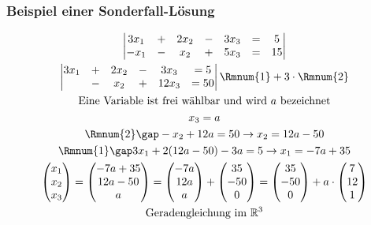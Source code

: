 \subsubsection{Beispiel einer Sonderfall-Lösung}
\begin{gather*}
  \begin{vmatrix}
    3x_1 & + & 2x_2 & - & 3x_3 & = & 5 \\
    -x_1 & - & x_2 & + & 5x_3 & = & 15
  \end{vmatrix} \\
  \begin{vmatrix}
    3x_1 & + & 2x_2 & - & 3x_3 & = 5 \\
    & - & x_2 & + & 12x_3 & = 50
  \end{vmatrix} \Rmnum{1} + 3 \cdot \Rmnum{2} \\
  \text{Eine Variable ist frei wählbar und wird $a$ bezeichnet} \\
  x_3 = a \\
  \Rmnum{2} \gap -x_2 + 12a = 50 \rightarrow x_2 = 12a - 50 \\
  \Rmnum{1} \gap 3x_1 + 2(12a - 50) - 3a = 5 \rightarrow x_1 = -7a + 35 \\
  \begin{pmatrix}
    x_1 \\ x_2 \\ x_3
  \end{pmatrix} =
  \begin{pmatrix}
    -7a + 35 \\ 12a - 50 \\ a
  \end{pmatrix} =
  \begin{pmatrix}
    -7a \\ 12a \\ a
  \end{pmatrix} +
  \begin{pmatrix}
    35 \\ -50 \\ 0
  \end{pmatrix} =
  \begin{pmatrix}
    35 \\ -50 \\ 0
  \end{pmatrix} + a \cdot
  \begin{pmatrix}
    7 \\ 12 \\ 1
  \end{pmatrix} \\
  \text{Geradengleichung im $\mathbb{R}^3$}
\end{gather*}
